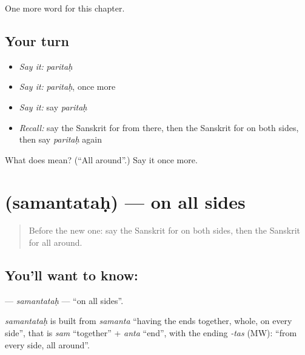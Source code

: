 \begin{grammarlens}[title={What you've built}]
One more word for this chapter.
\end{grammarlens}

\subsection*{Your turn}
\begin{itemize}
\raggedright
  \item \emph{Say it:} \emph{paritaḥ}
  \item \emph{Say it:} \emph{paritaḥ}, once more
  \item \emph{Say it:} say \emph{paritaḥ}
  \item \emph{Recall:} say the Sanskrit for from there, then the Sanskrit for on both sides, then say \emph{paritaḥ} again
\end{itemize}

\begin{tcolorbox}[breakable,colback=teal!4,colframe=teal!35!black,title={Before you move on}]
What does  mean? (\textquotedblleft{}All around\textquotedblright{}.) Say it once more.
\end{tcolorbox}
\section[\texorpdfstring{\sk{समन्ततः} (samantataḥ)}{समन्ततः (samantataḥ)}]{ (samantataḥ) — on all sides}

\label{lesson:SA-C153-samantatah}



\begin{quote}
Before the new one: say the Sanskrit for on both sides, then the Sanskrit for all around.
\end{quote}

\subsection*{You'll want to know: }
\textbf{} — \emph{samantataḥ} — \textquotedblleft{}on all sides\textquotedblright{}.

\begin{cousinweb}
\emph{samantataḥ} is built from \emph{samanta} \textquotedblleft{}having the ends together, whole, on every side\textquotedblright{}, that is \emph{sam} \textquotedblleft{}together\textquotedblright{} + \emph{anta} \textquotedblleft{}end\textquotedblright{}, with the ending \emph{-tas} (MW): \textquotedblleft{}from every side, all around\textquotedblright{}.
\end{cousinweb}


